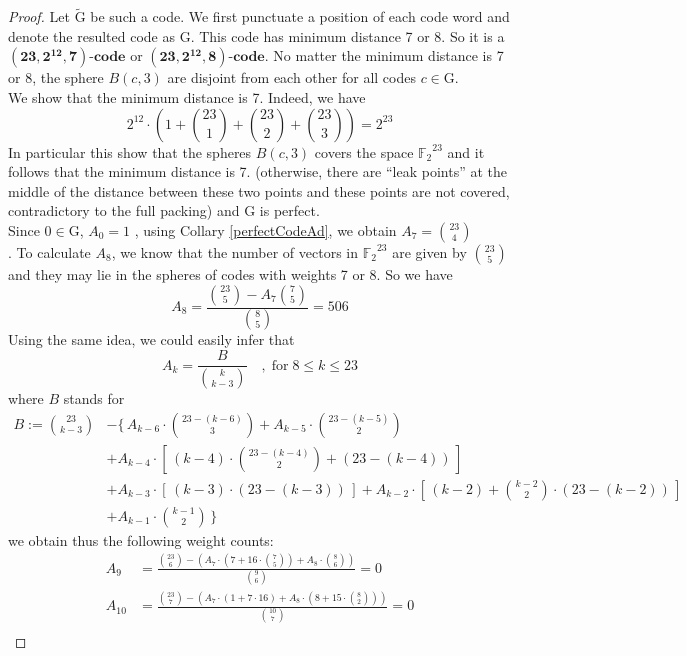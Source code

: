 \documentclass[12pt]{article}
\theoremstyle{definition}
\numberwithin{equation}{theorem}
\numberwithin{figure}{theorem}
\newcommand{\cCodes}{\ensuremath{\widetilde{\mathrm{G}}}}
\newcommand{\tildcCodes}{\ensuremath{{\mathrm{G}}}}
\newcommand{\code}[3]{\ensuremath{\bm{(#1,#2,#3)\mbox{-}code}}}
\newcommand{\ftwoN}[1]{\ensuremath{\mathbb{F}_2}^{#1}}
\begin{document}
\begin{proof}
Let {\cCodes} be such a code. We first punctuate a position 
of each code word and denote the resulted code as {\tildcCodes}.
This code has minimum distance 7 or 8. So it is a {\code{23}{2^{12}}{7}} or {\code{23}{2^{12}}{8}}. No matter the minimum distance is 7 or 8, the sphere $B(c,3)$ are disjoint from each other for all codes $c \in \tildcCodes$.\\
We show that the minimum distance is 7.  Indeed, we have
\[
	2^{12}\cdot(1 + \binom{23}{1} + \binom{23}{2} + \binom{23}{3}) = 2^{23}
\]
In particular this show that the spheres $B(c,3)$ covers the space {$\ftwoN{23}$} and it follows that the minimum distance is 7. (otherwise, there are ``leak points'' at the middle of the distance between these two points and these points are not covered, contradictory to the full packing) and {\tildcCodes} is perfect.\\
Since $0 \in \tildcCodes$, $A_0 = 1$ , using Collary \ref{perfectCodeAd}, we obtain $A_7 = \binom{23}{4}$\\.
To calculate $A_8$, we know that the number of vectors in $\ftwoN{23}$ are given by $\binom{23}{5}$ and they may lie in the spheres of codes with weights 7 or 8. So we have
\[
	A_8 = \frac{\binom{23}{5} - A_7\binom{7}{5}}{\binom{8}{5}} = 506
\]
Using the same idea, we could easily infer that
\begin{equation}\label{AxEqn}
	A_k = \frac{B}{\binom{k}{k-3}}\quad,\; \mbox{for}\; 8 \leq k \leq 23
\end{equation}
where $B$ stands for
\begin{align*}
B := \binom{23}{k-3} &- \{\,A_{k-6} \cdot \binom{23- (k - 6)}{3} + A_{k - 5} \cdot \binom{23 - (k - 5)}{2}\\ &+ A_{k - 4} \cdot \left[\,(k - 4)\cdot \binom{23 - (k-4)}{2} +
	(23 - (k-4))\,\right] \\&+ A_{k - 3} \cdot \left[\,(k - 3) \cdot (23 - (k - 3))\,\right] + A_{k - 2} \cdot \left[\,(k-2) + \binom{k - 2}{2} \cdot (23 - (k - 2))\,\right]\\ &+ A_{k-1} \cdot \binom{k-1}{2}\,\}
\end{align*}
we obtain thus the following weight counts:
	\begin{align*}
		A_9 &= \frac{\binom{23}{6} - (A_7 \cdot(7 + 16 \cdot \binom{7}{5}) + A_8\cdot \binom{8}{6})}{\binom{9}{6}} = 0\\
		A_{10} &= \frac{\binom{23}{7} - (A_7\cdot(1 + 7\cdot 16) + A_8\cdot(8 + 15 \cdot \binom{8}{2}))}{\binom{10}{7}} = 0 \\

\end{align*}
\end{proof}
\end{document}
